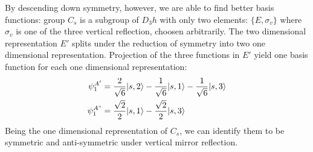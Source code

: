 \documentclass{article}
\begin{document}
By descending down symmetry, however, we are able to find better basis functions: group $C_s$ is a subgroup 
of $D_3h$ with only two elements: $\{E, \sigma_v\}$ where $\sigma_v$ is one of the three vertical reflection, 
choosen arbitrarily. 
The two dimensional representation $E'$ splits under the reduction of symmetry into two one dimensional representation.
Projection of the three functions in $E'$ yield one basis function for each one dimensional representation:
\begin{align}
    \psi_1^{A'} &= \frac{2}{\sqrt{6}} |s,2\rangle - \frac{1}{\sqrt{6}} |s,1\rangle - \frac{1}{\sqrt{6}} |s,3\rangle \\
    \psi_1^{A"} &= \frac{\sqrt{2}}{2} |s,1\rangle - \frac{\sqrt{2}}{2} |s,3\rangle
\end{align}
Being the one dimensional representation of $C_s$, we can identify them to be 
symmetric and anti-symmetric under vertical mirror reflection. 
\end{document}
